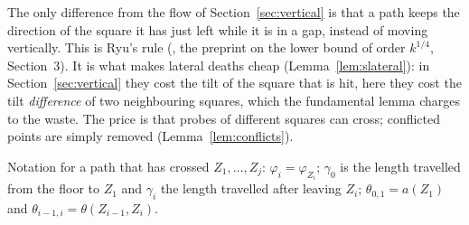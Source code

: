 \documentclass[11pt,letterpaper]{amsart}
\theoremstyle{plain}
\theoremstyle{definition}
\theoremstyle{remark}
\begin{document}
The only difference from the flow of Section~\ref{sec:vertical} is that a path keeps the direction of the square it has just left while it is in a gap, instead of moving vertically. This is Ryu's rule (\cite{Ryu26b}, the preprint on the lower bound of order $k^{1/4}$, Section~3). It is what makes lateral deaths cheap (Lemma~\ref{lem:slateral}): in Section~\ref{sec:vertical} they cost the tilt of the square that is hit, here they cost the tilt \emph{difference} of two neighbouring squares, which the fundamental lemma charges to the waste. The price is that probes of different squares can cross; conflicted points are simply removed (Lemma~\ref{lem:conflicts}).

Notation for a path that has crossed $Z_1,\ldots,Z_j$: $\varphi_i=\varphi_{Z_i}$; $\gamma_0$ is the length travelled from the floor to $Z_1$ and $\gamma_i$ the length travelled after leaving $Z_i$; $\theta_{0,1}=a(Z_1)$ and $\theta_{i-1,i}=\theta(Z_{i-1},Z_i)$.
\end{document}
